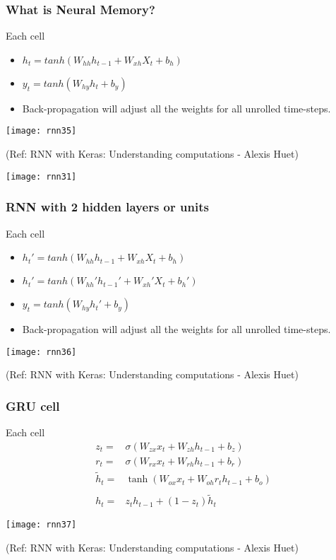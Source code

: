 \begin{frame}[fragile] \frametitle{What is Neural Memory?}
Each cell
\begin{itemize}
\item $h_t = tanh(W_{hh}h_{t-1} + W_{xh}X_t + b_h)$
\item $y_t = tanh(W_{hy}h_t + b_y)$
\item Back-propagation will adjust all the weights for all unrolled time-steps.
\end{itemize}


\begin{center}
\texttt{[image: rnn35]}

{\tiny (Ref: RNN with Keras: Understanding computations - Alexis Huet)}


\texttt{[image: rnn31]}
\end{center}
\end{frame}


\begin{frame}[fragile] \frametitle{RNN with 2 hidden layers or units}
Each cell
\begin{itemize}
\item $h_t' = tanh(W_{hh}h_{t-1} + W_{xh}X_t + b_h)$
\item $h_t' = tanh(W_{hh}'h_{t-1}' + W_{xh}'X_t + b_h')$
\item $y_t = tanh(W_{hy}h_t' + b_y)$
\item Back-propagation will adjust all the weights for all unrolled time-steps.
\end{itemize}


\begin{center}
\texttt{[image: rnn36]}

{\tiny (Ref: RNN with Keras: Understanding computations - Alexis Huet)}
\end{center}
\end{frame}

\begin{frame}[fragile] \frametitle{GRU cell}
Each cell
\begin{align}
z_t =& \sigma(W_{zx} x_t + W_{zh} h_{t-1} + b_z) \\
r_t =& \sigma(W_{rx} x_t + W_{rh} h_{t-1} + b_r) \\
\tilde{h}_t =& \tanh(W_{ox} x_t + W_{oh} r_t h_{t-1} + b_o) \\
 \\
h_t =& z_t h_{t-1} + (1 - z_t) \tilde{h}_t
\end{align} %


\begin{center}
\texttt{[image: rnn37]}

{\tiny (Ref: RNN with Keras: Understanding computations - Alexis Huet)}
\end{center}
\end{frame}

